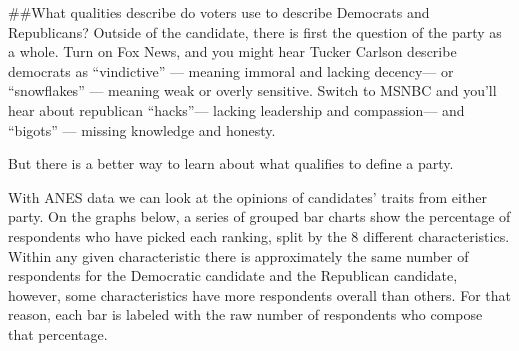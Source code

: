\documentclass[
]{article}
\newenvironment{Shaded}{\begin{snugshade}}{\end{snugshade}}
\newcommand{\CommentTok}[1]{\textcolor[rgb]{0.56,0.35,0.01}{\textit{#1}}}
\newcommand{\DataTypeTok}[1]{\textcolor[rgb]{0.13,0.29,0.53}{#1}}
\newcommand{\DecValTok}[1]{\textcolor[rgb]{0.00,0.00,0.81}{#1}}
\newcommand{\KeywordTok}[1]{\textcolor[rgb]{0.13,0.29,0.53}{\textbf{#1}}}
\newcommand{\NormalTok}[1]{#1}
\newcommand{\OperatorTok}[1]{\textcolor[rgb]{0.81,0.36,0.00}{\textbf{#1}}}
\newcommand{\StringTok}[1]{\textcolor[rgb]{0.31,0.60,0.02}{#1}}
\begin{document}
\#\#What qualities describe do voters use to describe Democrats and
Republicans? Outside of the candidate, there is first the question of
the party as a whole. Turn on Fox News, and you might hear Tucker
Carlson describe democrats as ``vindictive'' --- meaning immoral and
lacking decency--- or ``snowflakes'' --- meaning weak or overly
sensitive. Switch to MSNBC and you'll hear about republican ``hacks''---
lacking leadership and compassion--- and ``bigots'' --- missing
knowledge and honesty.

But there is a better way to learn about what qualifies to define a
party.

With ANES data we can look at the opinions of candidates' traits from
either party. On the graphs below, a series of grouped bar charts show
the percentage of respondents who have picked each ranking, split by the
8 different characteristics. Within any given characteristic there is
approximately the same number of respondents for the Democratic
candidate and the Republican candidate, however, some characteristics
have more respondents overall than others. For that reason, each bar is
labeled with the raw number of respondents who compose that percentage.

\begin{Shaded}
\end{Shaded}
\end{document}
